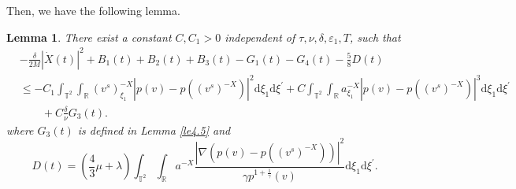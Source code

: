 \documentclass[10pt,reqno]{amsart}
\numberwithin{equation}{section}
\newtheorem{lemma}[theorem]{Lemma}
\newcommand{\dif}{\mathrm{d}}
\begin{document}
Then, we have the following lemma.
\begin{lemma}\label{le4.6}
There exist a constant $C, C_1>0$ independent of $\tau, \nu, \delta, \varepsilon_1, T$, such that
\begin{align*}
&-\frac{\delta}{2M}|\dot{X}(t)|^2+B_1(t)+B_2(t)+B_{3}(t)-G_1(t)-G_4(t)-\frac{5}{8}D(t)\\
&\le
-C_1\int_{\mathbb{T}^2}\int_{\mathbb{R}}(v^s)^{-X}_{\xi_1}|p(v)-p((v^s)^{-X})|^2\dif \xi_1\dif \xi^{\prime}
+C\int_{\mathbb{T}^2}\int_{\mathbb{R}}a^{-X}_{\xi_1}|p(v)-p((v^s)^{-X})|^3\dif \xi_1\dif \xi^{\prime}\\
&\qquad+C\frac{\delta}{\nu}G_3(t).
\end{align*}
where $G_3(t)$ is defined in Lemma \ref{le4.5} and
\[
D(t)=(\frac{4}{3}\mu+\lambda)\int_{\mathbb{T}^2}\int_{\mathbb{R}}
a^{-X}\frac{|\nabla(p(v)-p((v^s)^{-X}))|^2}{\gamma p^{1+\frac{1}{\gamma}}(v)}\dif \xi_1\dif \xi^{\prime}.
\]
\end{lemma}
\end{document}
